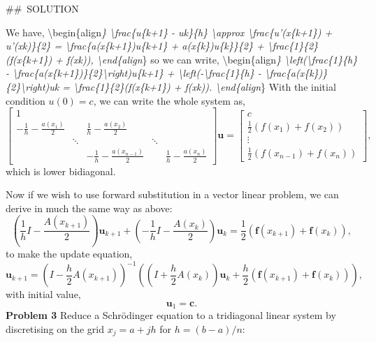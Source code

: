 \documentclass[12pt,a4paper]{article}
\begin{document}
\#\# SOLUTION

We have, {\textbackslash}begin\{align\emph{\} {\textbackslash}frac\{u\emph{\{k+1\} - u}k\}\{h\} {\textbackslash}approx {\textbackslash}frac\{u'(x\emph{\{k+1\}) + u'(x}k)\}\{2\} = {\textbackslash}frac\{a(x\emph{\{k+1\})u}\{k+1\} + a(x\emph{\{k\})u}\{k\}\}\{2\} + {\textbackslash}frac\{1\}\{2\}(f(x\emph{\{k+1\}) + f(x}k)), {\textbackslash}end\{align}\} so we can write, {\textbackslash}begin\{align\emph{\} {\textbackslash}left({\textbackslash}frac\{1\}\{h\} - {\textbackslash}frac\{a(x\emph{\{k+1\})\}\{2\}{\textbackslash}right)u}\{k+1\} + {\textbackslash}left(-{\textbackslash}frac\{1\}\{h\} - {\textbackslash}frac\{a(x\emph{\{k\})\}\{2\}{\textbackslash}right)u}k = {\textbackslash}frac\{1\}\{2\}(f(x\emph{\{k+1\}) + f(x}k)). {\textbackslash}end\{align}\} With the initial condition $u(0) = c$, we can write the whole system as,
\[
\left[\begin{matrix}
1 \\
-\frac{1}{h} - \frac{a(x_1)}{2} && \frac{1}{h} - \frac{a(x_2)}{2} \\
& \ddots && \ddots \\
 & & -\frac{1}{h} - \frac{a(x_{n-1})}{2} && \frac{1}{h} - \frac{a(x_n)}{2}
\end{matrix}\right]\mathbf{u} =  \left[\begin{matrix} 
c \\
\frac{1}{2}\left(f(x_1) + f(x_2)\right) \\
\vdots \\
\frac{1}{2}\left(f(x_{n-1}) + f(x_n)\right)
\end{matrix}\right],
\]
which is lower bidiagonal.

Now if we wish to use forward substitution in a vector linear problem, we can derive in much the same way as above:
\[
\left(\frac{1}{h}I - \frac{A(x_{k+1})}{2}\right)\mathbf{u}_{k+1} + \left(-\frac{1}{h}I - \frac{A(x_{k})}{2}\right)\mathbf{u}_k = \frac{1}{2}(\mathbf{f}(x_{k+1}) + \mathbf{f}(x_k)),
\]
to make the update equation,
\[
\mathbf{u}_{k+1} = \left(I - \frac{h}{2}A(x_{k+1})\right)^{-1}\left(\left(I + \frac{h}{2}A(x_{k})\right)\mathbf{u}_k + \frac{h}{2}(\mathbf{f}(x_{k+1}) + \mathbf{f}(x_k)) \right),
\]
with initial value,
\[
\mathbf{u}_1 = \mathbf{c}.
\]
\textbf{Problem 3} Reduce a Schrödinger equation to a tridiagonal linear system by discretising on the grid $x_j = a + j h$ for $h = (b-a)/n$:
\end{document}
